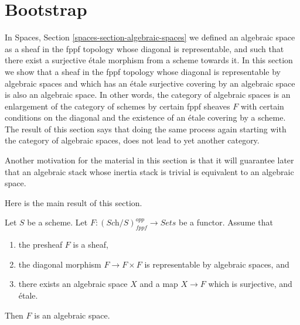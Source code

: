 \section{Bootstrap}
\label{section-bootstrap}

\noindent
In
Spaces, Section \ref{spaces-section-algebraic-spaces}
we defined an algebraic space as a sheaf in the fppf topology whose
diagonal is representable, and such that there exist a surjective \'etale
morphism from a scheme towards it. In this section we show that
a sheaf in the fppf topology whose diagonal is representable by algebraic
spaces and which has an \'etale surjective covering by an algebraic space
is also an algebraic space.
In other words, the category of algebraic spaces is an enlargement of the
category of schemes by certain fppf sheaves $F$ with certain conditions
on the diagonal and the existence of an \'etale covering by a scheme. The
result of this section says that doing the same process again starting with
the category of algebraic spaces, does not lead to yet another category.

\medskip\noindent
Another motivation for the material in this section is that it will guarantee
later that an algebraic stack whose inertia stack is trivial is equivalent
to an algebraic space.

\medskip\noindent
Here is the main result of this section.

\begin{theorem}
\label{theorem-bootstrap}
Let $S$ be a scheme.
Let $F : (\textit{Sch}/S)_{fppf}^{opp} \to \textit{Sets}$ be a functor.
Assume that
\begin{enumerate}
\item the presheaf $F$ is a sheaf,
\item the diagonal morphism $F  \to F \times F$ is representable by
algebraic spaces, and
\item there exists an algebraic space $X$
and a map $X \to F$ which is surjective, and \'etale.
\end{enumerate}
Then $F$ is an algebraic space.
\end{theorem}

